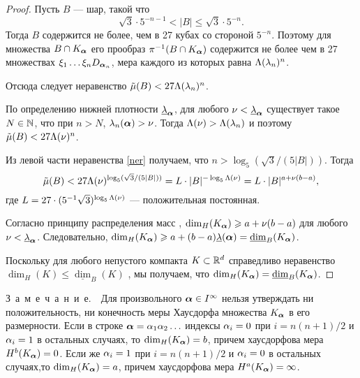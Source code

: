 \begin{proof}
Пусть $B$ --- шар, такой что
\begin{equation}\label{ner}{\sqrt{3}}\cdot 5^{-n-1}<|B|\le{\sqrt{3}}\cdot 5^{-n}.
\end{equation}
Тогда $B$ содержится не более, чем в 27 кубах со стороной $5^{-n}$. Поэтому для множества $B\cap K_{\bm{\alpha}}$  его прообраз $\pi^{-1}(B\cap K_{\bm{\alpha}})$ содержится не более чем в 27 множествах  $\xi_1\ldots \xi_n D_{{\bm{\alpha}}_n}$, мера каждого из которых равна $\Lambda(\lambda_n)^n$.

Отсюда следует неравенство $\tilde\mu(B)<27\Lambda(\lambda_n)^n$.

По определению нижней плотности $\underline{\lambda}_{\bm{\alpha}}$, для любого
$\nu<\underline{\lambda}_{\bm{\alpha}}$ существует такое $N\in\mathbb{N}$, что при $n>N$, $\lambda_n({\bm{\alpha}}) > \nu$. Тогда $\Lambda(\nu)>\Lambda(\lambda_n)$  и поэтому
 $\tilde\mu(B)<27\Lambda(\nu)^n$.

 Из левой части неравенства \eqref{ner} получаем, что $n>\log_5(\sqrt{3}/(5|B|))$.
Тогда 
\begin{equation}
\tilde\mu(B)<27 \Lambda(\nu)^{\log_5(\sqrt{3}/(5|B|))}=L\cdot|B|^{-\log_5{\Lambda(\nu)}} =L\cdot |B|^{a+\nu(b-a)},
\end{equation}
где $L=27\cdot(5^{-1}\sqrt{3})^{\log_5{\Lambda(\nu)}}$ --- положительная постоянная.

Согласно принципу распределения масс \cite[Mass distribution Principle~4.2, p.55]{Falconer2004}, $\dim_H(K_{\bm{\alpha}})\geqslant a+\nu(b-a)$ для любого $\nu<\underline{\lambda}_{\bm{\alpha}}$.
Следовательно, $\dim_H(K_{\bm{\alpha}})\geqslant  a+(b-a)\underline{\lambda}({\bm{\alpha}}) =\underline{\dim}_B(K_{\bm{\alpha}})$.

Поскольку  для любого непустого компакта $K\subset\mathbb{R}^d$ справедливо неравенство $\dim_H(K)\leqslant\underline{\dim}_B(K)$ \cite[(3.17), p.~43]{Falconer2004}, мы получаем, что $\dim_H( K_{\bm{\alpha}})=\underline{\dim}_B( K_{\bm{\alpha}})$.
\end{proof}

\mbox{З\ а\ м\ е\ ч\ а\ н\ и\ е.}\ \  Для произвольного ${\bm{\alpha}}\in I^\infty$ нельзя утверждать ни положительность, ни конечность меры Хаусдорфа множества $K_{\bm{\alpha}}$ в его размерности. Если в строке ${\bm{\alpha}}=\alpha_1\alpha_2\ldots$ индексы $\alpha_i=0$ при  $i=n(n+1)/2$ и $\alpha_i=1$ в остальных случаях, то $\dim_H(K_{\bm{\alpha}})=b$, причем хаусдорфова мера $H^b(K_{\bm{\alpha}})=0$.
 Если же $\alpha_i=1$ при  $i=n(n+1)/2$ и $\alpha_i=0$ в остальных случаях,то $\dim_H(K_{\bm{\alpha}})=a$, причем хаусдорфова мера $H^a(K_{\bm{\alpha}})=\infty$.
